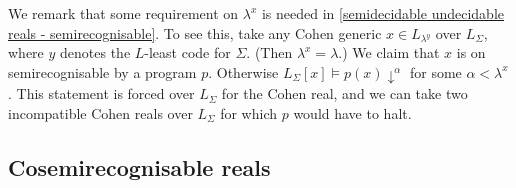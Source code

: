 \documentclass[a4paper,11pt]{amsart}
\theoremstyle{definition}
\newtheorem*{problem A}{Problem 1}
\newtheorem*{problem B}{Problem 2}
\theoremstyle{remark}
\begin{document}



 We remark that some requirement on $\lambda^{x}$ is needed in \ref{semidecidable undecidable reals - semirecognisable}.
 To see this, take any Cohen generic $x \in L_{\lambda^{y}}$ over $L_{\Sigma}$, where $y$ denotes the $L$-least code for $\Sigma$. 
 (Then $\lambda^x=\lambda$.) 
We claim that $x$ is on semirecognisable by a program $p$. 
Otherwise $L_{\Sigma}[x]\models p(x){\downarrow}^\alpha$ for some $\alpha < \lambda^{x}$. 
This statement is forced over $L_{\Sigma}$ for the Cohen real, and we can take two incompatible Cohen reals over $L_\Sigma$ for which $p$ would have to halt. 




\subsection{Cosemirecognisable reals}
\end{document}
